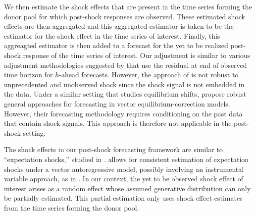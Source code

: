 \documentclass[11pt,3p,review,authoryear]{elsarticle}
\theoremstyle{definition}
\begin{document}
We then estimate the shock effects that are present in the time series forming the donor pool for which post-shock responses are observed. These estimated shock effects are then aggregated and this aggregated estimator is taken to be the estimator for the shock effect in the time series of interest. Finally, this aggreagted estimator is then added to a forecast for the yet to be realized post-shock response of the time series of interest. Our adjustment is similar to various adjustment methodologies suggested by \cite{clements1996intercept} that use the residual at end of observed time horizon for $h$-ahead forecasts. However, the approach of \cite{clements1996intercept} is not robust to unprecedented and unobserved shock since the shock signal is not embedded in the data. Under a similar setting that studies equilibrium shifts, \cite{castle2015robust} propose robust general approaches for forecasting in vector equilibrium-correction models. However, their forecasting methodology requires conditioning on the past data that contain shock signals. This approach is therefore not applicable in the post-shock setting.


The shock effects in our post-shock forecasting framework are similar to ``expectation shocks,'' studied in \cite{clements2019measuring}. \cite{clements2019measuring} allows for consistent estimation of expectation shocks under a vector autoregressive model, possibly involving an instrumental variable approach, as in \cite{croushore2006data}. In our context, the yet to be observed shock effect of interest arises as a random effect whose assumed generative distribution can only be partially estimated. This partial estimation only uses shock effect estimates from the time series forming the donor pool. 
\end{document}
